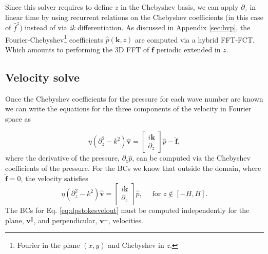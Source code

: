 \documentclass[ twoside,openright,titlepage,numbers=noenddot,%
headinclude,footinclude,cleardoublepage=empty,abstract=on,
BCOR=5mm,paper=b5,fontsize=11pt, dvipsnames
]{scrreprt}
\renewcommand{\vec}[1]{\bm{#1}}
\newcommand{\fou}[1]{\widehat{#1}}
\newcommand{\fvel}{v}
\begin{document}
Since this solver requires to define $z$ in the Chebyshev basis, we can apply $\partial_z$ in linear time by using recurrent relations on the Chebyshev coefficients (in this case of $\fou{f}^z$) instead of via \emph{ik} differentiation. As discussed in Appendix \ref{sec:bvp}, the Fourier-Chebyshev\footnote{Fourier in the plane $(x,y)$ and Chebyshev in $z$.} coefficients $\fou{p}(\vec{k}, z)$ are computed via a hybrid \gls{FFT}-\gls{FCT}. Which amounts to performing the 3D \gls{FFT} of $\vec{f}$ periodic extended in $z$.

\subsection*{Velocity solve}
Once the Chebyshev coefficients for the pressure for each wave number are known we can write the equations for the three components of the velocity in Fourier space as

\begin{equation}
  \label{eq:dpstokesvel}
  \eta\left(\partial^2_{z} -k^2\right)\fou{\vec{\fvel}} = 
  \begin{bmatrix}
    i\vec{k}\\
    \partial_z
  \end{bmatrix}
  \fou{p} -\fou{\vec{f}},
\end{equation}
where the derivative of the pressure, $\partial_z\fou{p}$, can be computed via the Chebyshev coefficients of the pressure.
For the \glspl{BC} we know that outside the domain, where $\fou{\vec{f}} = 0$, the velocity satisfies
\begin{equation}
  \label{eq:dpstokesvelout}
  \eta\left(\partial^2_{z} -k^2\right)\fou{\vec{\fvel}} = 
  \begin{bmatrix}
    i\vec{k}\\
    \partial_z
  \end{bmatrix}
  \fou{p}, \quad \text{ for } z \notin [-H,H].
\end{equation}
The \glspl{BC} for Eq. \eqref{eq:dpstokesvelout} must be computed independently for the plane, $\vec{\fvel}^\parallel$, and perpendicular, $\vec{\fvel}^\perp$, velocities.
\end{document}
